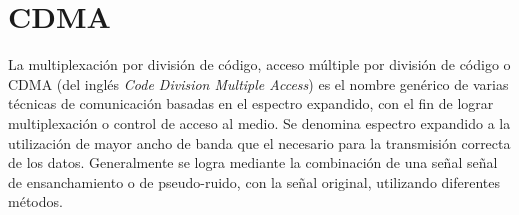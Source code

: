 




\section{CDMA}
\label{espectroensanchado}
La multiplexación por división de código, acceso múltiple por división de código o CDMA (del inglés \textit{Code Division Multiple Access}) es el nombre genérico de varias técnicas de comunicación basadas en el espectro expandido, con el fin de lograr multiplexación o control de acceso al medio. 
Se denomina espectro expandido a la utilización de mayor ancho de banda que el necesario para la transmisión correcta de los datos. Generalmente se logra mediante la combinación de una señal señal de ensanchamiento o de pseudo-ruido, con la señal original, utilizando diferentes métodos.

